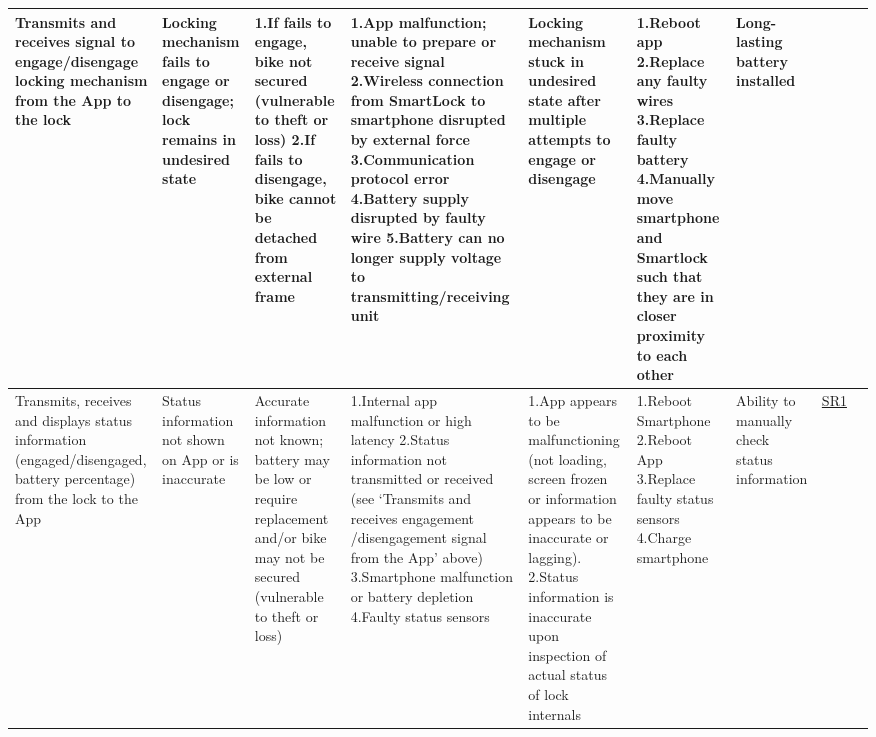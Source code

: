 \documentclass{article}
\begin{document}
\begin{table}[H]
\begin{tabular}{| p{} | p{}  | p{} | p{} | p{} | p{} | p{} | p{} | p{} |}
Transmits and receives signal to engage/disengage locking mechanism from the App to the lock & Locking mechanism fails to engage or disengage; lock remains in undesired state & 1.If fails to engage, bike not secured (vulnerable to theft or loss) \newline 2.If fails to disengage, bike cannot be detached from external frame & 1.App malfunction; unable to prepare or receive signal \newline 2.Wireless connection from SmartLock to smartphone disrupted by external force \newline 3.Communication protocol error \newline 4.Battery supply disrupted by faulty wire \newline 5.Battery can no longer supply voltage to transmitting/receiving unit & Locking mechanism stuck in undesired state after multiple attempts to engage or disengage & 1.Reboot app  \newline 2.Replace any faulty wires \newline 3.Replace faulty battery \newline 4.Manually move smartphone and Smartlock such that they are in closer proximity to each other & Long-lasting battery installed &  &  \\ \hline

Transmits, receives and displays status information (engaged/disengaged, battery percentage) from the lock to the App & Status information not shown on App or is inaccurate & Accurate information not known; battery may be low or require replacement and/or bike may not be secured (vulnerable to theft or loss) & 1.Internal app malfunction or high latency \newline 2.Status information not transmitted or received (see ‘Transmits and receives engagement /disengagement signal from the App’ above) \newline 3.Smartphone malfunction or battery depletion \newline 4.Faulty status sensors & 1.App appears to be malfunctioning (not loading, screen frozen or information appears to be inaccurate or lagging).  \newline 2.Status information is inaccurate upon inspection of actual status of lock internals & 1.Reboot Smartphone \newline 2.Reboot App \newline 3.Replace faulty status sensors \newline 4.Charge smartphone & Ability to manually check status information & \hyperref[SR1]{SR1} &  \\ \hline


\end{tabular}
\end{table}
\end{document}
